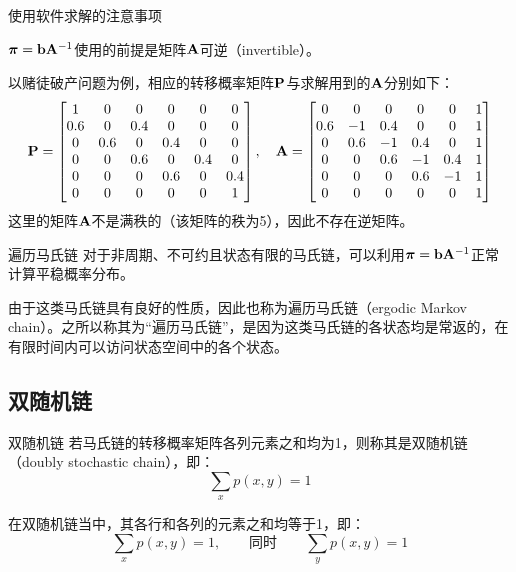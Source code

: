 \documentclass[t]{beamer}
\begin{document}
\begin{frame}{使用软件求解的注意事项}
    \begin{spacing}{1.2}
        \small
        $\bm{\pi}={\bf b}{\bf A}^{-1}$使用的前提是矩阵${\bf A}$可逆（invertible）。
    
        以赌徒破产问题为例，相应的转移概率矩阵${\bf P}$与求解用到的${\bf A}$分别如下：
        \[{\bf P}=\begin{bmatrix}
         1 & 0 & 0 & 0 & 0 & 0\\
         0.6 & 0 & 0.4 & 0 & 0 & 0\\
         0 & 0.6 & 0 & 0.4 & 0 & 0\\
         0 & 0 & 0.6 & 0 & 0.4 & 0\\
         0 & 0 & 0 & 0.6 & 0 & 0.4\\
         0 & 0 & 0 & 0 & 0 & 1\\
        \end{bmatrix},\quad 
        {\bf A}=\begin{bmatrix}
            0 &   0 &   0 &   0 &   0  &  1\\
            0.6&   -1  &  0.4 &   0 &   0  &  1\\
            0  &  0.6  & -1 &   0.4 &   0  &  1\\
           0 &   0  &  0.6 &  -1  &  0.4 &   1\\
            0 &   0 &   0 &   0.6 &  -1 &   1\\
            0 &   0 &   0 &   0 &   0 &   1\\
        \end{bmatrix} \]
        这里的矩阵${\bf A}$不是满秩的（该矩阵的秩为5），因此不存在逆矩阵。
    \end{spacing}

\end{frame}


\begin{frame}{遍历马氏链}
    对于非周期、不可约且状态有限的马氏链，可以利用$\bm{\pi}={\bf b}{\bf A}^{-1}$正常计算平稳概率分布。
    
    由于这类马氏链具有良好的性质，因此也称为遍历马氏链（ergodic Markov chain）。之所以称其为“遍历马氏链”，是因为这类马氏链的各状态均是常返的，在有限时间内可以访问状态空间中的各个状态。
\end{frame}

\subsection{双随机链}
\begin{frame}{双随机链}
    若马氏链的转移概率矩阵各列元素之和均为1，则称其是双随机链（doubly stochastic chain），即：
    \[\sum_x p(x,y)=1\]
    
    在双随机链当中，其各行和各列的元素之和均等于1，即：
\[\sum_x p(x,y)=1,\qquad \text{同时}\qquad \sum_y p(x,y)=1 \]


\end{frame}
\end{document}
